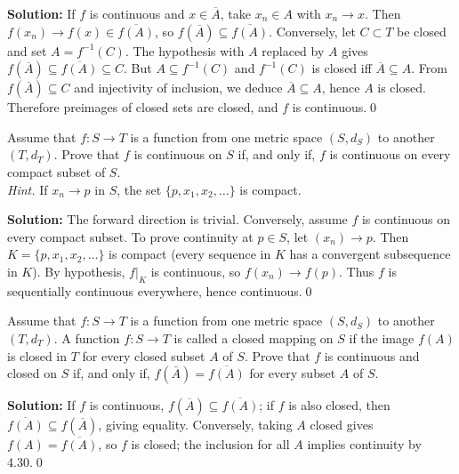 \noindent\textbf{Solution:}
If $f$ is continuous and $x\in\overline{A}$, take $x_n\in A$ with $x_n\to x$. Then $f(x_n)\to f(x)\in\overline{f(A)}$, so $f(\overline{A})\subseteq\overline{f(A)}$. Conversely, let $C\subset T$ be closed and set $A=f^{-1}(C)$. The hypothesis with $A$ replaced by $A$ gives $f(\overline{A})\subseteq\overline{f(A)}\subseteq C$. But $A\subseteq f^{-1}(C)$ and $f^{-1}(C)$ is closed iff $\overline{A}\subseteq A$. From $f(\overline{A})\subseteq C$ and injectivity of inclusion, we deduce $\overline{A}\subseteq A$, hence $A$ is closed. Therefore preimages of closed sets are closed, and $f$ is continuous.\qed



\begin{problembox}
Assume that $f : S \rightarrow T$ is a function from one metric space $(S, d_S)$ to another $(T, d_T)$. Prove that $f$ is continuous on $S$ if, and only if, $f$ is continuous on every compact subset of $S$. \\
\textit{Hint.} If $x_n \rightarrow p$ in $S$, the set $\{p, x_1, x_2, \ldots\}$ is compact.
\end{problembox}

\noindent\textbf{Solution:}
The forward direction is trivial. Conversely, assume $f$ is continuous on every compact subset. To prove continuity at $p\in S$, let $(x_n)\to p$. Then $K=\{p,x_1,x_2,\ldots\}$ is compact (every sequence in $K$ has a convergent subsequence in $K$). By hypothesis, $f|_K$ is continuous, so $f(x_n)\to f(p)$. Thus $f$ is sequentially continuous everywhere, hence continuous.\qed



\begin{problembox}
Assume that $f : S \rightarrow T$ is a function from one metric space $(S, d_S)$ to another $(T, d_T)$. A function $f : S \rightarrow T$ is called a closed mapping on $S$ if the image $f(A)$ is closed in $T$ for every closed subset $A$ of $S$. Prove that $f$ is continuous and closed on $S$ if, and only if, $f(\bar{A}) = \overline{f(A)}$ for every subset $A$ of $S$.
\end{problembox}

\noindent\textbf{Solution:}
If $f$ is continuous, $f(\overline{A})\subseteq\overline{f(A)}$; if $f$ is also closed, then $\overline{f(A)}\subseteq f(\overline{A})$, giving equality. Conversely, taking $A$ closed gives $f(A)=\overline{f(A)}$, so $f$ is closed; the inclusion for all $A$ implies continuity by 4.30.\qed



